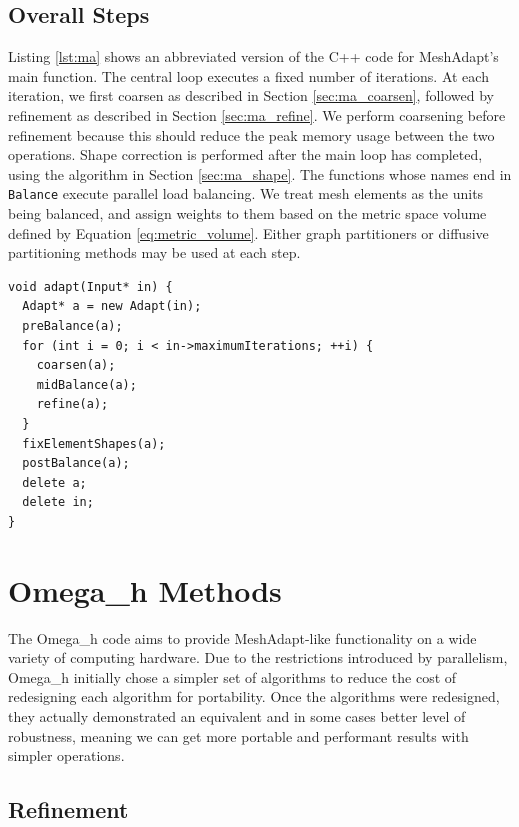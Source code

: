 \subsection{Overall Steps}

Listing \ref{lst:ma} shows an abbreviated version of the C++
code for MeshAdapt's main function.
The central loop executes a fixed number of iterations.
At each iteration, we first coarsen as described
in Section \ref{sec:ma_coarsen}, followed by refinement
as described in Section \ref{sec:ma_refine}.
We perform coarsening before refinement because this
should reduce the peak memory usage between the two
operations.
Shape correction is performed after the main loop
has completed, using the algorithm in Section \ref{sec:ma_shape}.
The functions whose names end in \texttt{Balance} execute
parallel load balancing.
We treat mesh elements as the units being balanced,
and assign weights to them based on the metric space
volume defined by Equation \ref{eq:metric_volume}.
Either graph partitioners \cite{devine2002zoltan} or
diffusive partitioning methods \cite{SmithParma2015}
may be used at each step.

\begin{lstlisting}[float,style=dan-style,caption=MeshAdapt main function,label=lst:ma]
void adapt(Input* in) {
  Adapt* a = new Adapt(in);
  preBalance(a);
  for (int i = 0; i < in->maximumIterations; ++i) {
    coarsen(a);
    midBalance(a);
    refine(a);
  }
  fixElementShapes(a);
  postBalance(a);
  delete a;
  delete in;
}
\end{lstlisting}

\section{Omega\_h Methods}
\label{sec:omega_h-adapt}

The Omega\_h code aims to provide MeshAdapt-like functionality
on a wide variety of computing hardware.
Due to the restrictions introduced by parallelism, Omega\_h
initially chose a simpler set of algorithms to reduce the
cost of redesigning each algorithm for portability.
Once the algorithms were redesigned, they actually demonstrated
an equivalent and in some cases better level of robustness,
meaning we can get more portable and performant results
with simpler operations.

\subsection{Refinement}
\label{sec:osh_refine}

